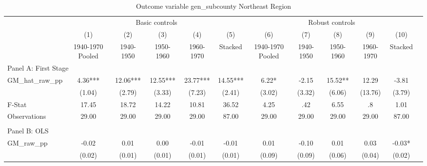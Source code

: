  \begin{table}[htbp]\centering {} \begin{threeparttable} \caption{Outcome variable gen\_subcounty Northeast Region} \begin{tabular}{l*{11}{c}} \toprule
          &\multicolumn{5}{c}{Basic controls}                                   &\multicolumn{5}{c}{Robust controls}                                  \\\cmidrule(lr){2-6}\cmidrule(lr){7-11}
          &\multicolumn{1}{c}{(1)}&\multicolumn{1}{c}{(2)}&\multicolumn{1}{c}{(3)}&\multicolumn{1}{c}{(4)}&\multicolumn{1}{c}{(5)}&\multicolumn{1}{c}{(6)}&\multicolumn{1}{c}{(7)}&\multicolumn{1}{c}{(8)}&\multicolumn{1}{c}{(9)}&\multicolumn{1}{c}{(10)}\\
          &\multicolumn{1}{c}{1940-1970 Pooled}&\multicolumn{1}{c}{1940-1950}&\multicolumn{1}{c}{1950-1960}&\multicolumn{1}{c}{1960-1970}&\multicolumn{1}{c}{Stacked}&\multicolumn{1}{c}{1940-1970 Pooled}&\multicolumn{1}{c}{1940-1950}&\multicolumn{1}{c}{1950-1960}&\multicolumn{1}{c}{1960-1970}&\multicolumn{1}{c}{Stacked}\\
\cmidrule(lr){1-11}
\multicolumn{10}{l}{Panel A: First Stage}\\
\cmidrule(lr){1-11}
GM\_hat\_raw\_pp&      4.36***&     12.06***&     12.55***&     23.77***&     14.55***&      6.22*  &     -2.15   &     15.52** &     12.29   &     -3.81   \\
          &    (1.04)   &    (2.79)   &    (3.33)   &    (7.23)   &    (2.41)   &    (3.02)   &    (3.32)   &    (6.06)   &   (13.76)   &    (3.79)   \\
\midrule
F-Stat    &     17.45   &     18.72   &     14.22   &     10.81   &     36.52   &      4.25   &       .42   &      6.55   &        .8   &      1.01   \\
Observations&     29.00   &     29.00   &     29.00   &     29.00   &     87.00   &     29.00   &     29.00   &     29.00   &     29.00   &     87.00   \\
\cmidrule[\heavyrulewidth](lr){1-11} \\ \cmidrule[\heavyrulewidth](lr){1-11}
\multicolumn{10}{l}{Panel B: OLS}\\
\cmidrule(lr){1-11}
GM\_raw\_pp &     -0.02   &      0.01   &      0.00   &     -0.01   &     -0.01   &      0.01   &     -0.10   &      0.01   &      0.03   &     -0.03*  \\
          &    (0.02)   &    (0.01)   &    (0.01)   &    (0.01)   &    (0.01)   &    (0.09)   &    (0.09)   &    (0.06)   &    (0.04)   &    (0.02)   \\

\end{tabular}
\end{threeparttable}
\end{table}

